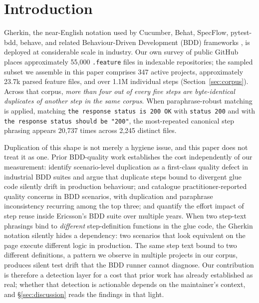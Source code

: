 \documentclass[11pt,a4paper]{article}
\begin{document}
\section{Introduction}
\label{sec:introduction}

Gherkin, the near-English notation used by Cucumber, Behat, SpecFlow,
pytest-bdd, behave, and related Behaviour-Driven Development (BDD)
frameworks \citep{north2006bdd,wynne2017cucumber}, is deployed at
considerable scale in industry. Our own survey of public GitHub places
approximately 55{,}000 \texttt{.feature} files in indexable repositories;
the sampled subset we assemble in this paper comprises 347 active
projects, approximately 23.7k parsed feature files, and over 1.1M individual steps
(Section~\ref{sec:corpus}). Across that corpus, \emph{more than four out
of every five steps are byte-identical duplicates of another step in the
same corpus}. When paraphrase-robust matching is applied, matching
\texttt{the response status is 200 OK} with \texttt{status 200} and with
\texttt{the response status should be "200"}, the most-repeated canonical
step phrasing appears 20{,}737 times across 2{,}245 distinct files.

Duplication of this shape is not merely a hygiene issue, and this paper
does not treat it as one. Prior BDD-quality work establishes the cost
independently of our measurement: \citet{binamungu2018vst} identify
scenario-level duplication as a first-class quality defect in industrial
BDD suites and argue that duplicate steps bound to divergent glue code
silently drift in production behaviour; \citet{oliveira2017quality} and
\citet{oliveira2019quality} catalogue practitioner-reported quality
concerns in BDD scenarios, with duplication and paraphrase inconsistency
recurring among the top three; \citet{irshad2021jss} and
\citet{irshad2022ist} quantify the effort impact of step reuse inside
Ericsson's BDD suite over multiple years. When two step-text phrasings
bind to \emph{different} step-definition functions in the glue code,
the Gherkin notation silently hides a dependency: two scenarios that
look equivalent on the page execute different logic in production.
The same step text bound to two different definitions, a pattern we
observe in multiple projects in our corpus, produces silent test drift
that the BDD runner cannot diagnose. Our contribution is therefore a
detection layer for a cost that prior work has already established as
real; whether that detection is actionable depends on the maintainer's
context, and §\ref{sec:discussion} reads the findings in that light.
\end{document}
